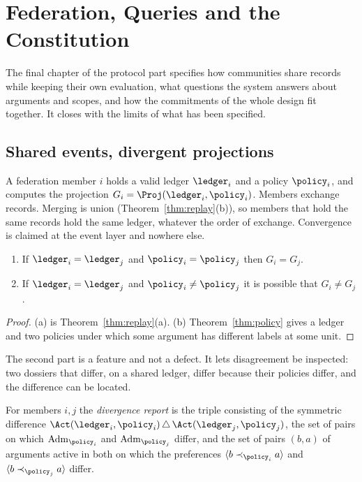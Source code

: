 \chapter{Federation, Queries and the Constitution}\label{ch:federation}

The final chapter of the protocol part specifies how communities share records while keeping their own evaluation, what questions the system answers about arguments and scopes, and how the commitments of the whole design fit together. It closes with the limits of what has been specified.

\section{Shared events, divergent projections}\label{sec:federation}

A federation member $i$ holds a valid ledger $\ledger_i$ and a policy $\policy_i$, and computes the projection $G_i=\Proj(\ledger_i,\policy_i)$. Members exchange records. Merging is union (Theorem~\ref{thm:replay}(b)), so members that hold the same records hold the same ledger, whatever the order of exchange. Convergence is claimed at the event layer and nowhere else.

\begin{proposition}\label{prop:eventlayer}
\begin{enumerate}[label=(\alph*)]
\item If $\ledger_i=\ledger_j$ and $\policy_i=\policy_j$ then $G_i=G_j$.
\item If $\ledger_i=\ledger_j$ and $\policy_i\ne\policy_j$ it is possible that $G_i\ne G_j$.
\end{enumerate}
\end{proposition}

\begin{proof}
(a) is Theorem~\ref{thm:replay}(a). (b) Theorem~\ref{thm:policy} gives a ledger and two policies under which some argument has different labels at some unit.
\end{proof}

The second part is a feature and not a defect. It lets disagreement be inspected: two dossiers that differ, on a shared ledger, differ because their policies differ, and the difference can be located.

\begin{definition}\label{def:divreport}
For members $i,j$ the \emph{divergence report} is the triple consisting of the symmetric difference $\Act(\ledger_i,\policy_i)\,\triangle\,\Act(\ledger_j,\policy_j)$, the set of pairs on which $\mathrm{Adm}_{\policy_i}$ and $\mathrm{Adm}_{\policy_j}$ differ, and the set of pairs $(b,a)$ of arguments active in both on which the preferences $\langle b\prec_{\policy_i}a\rangle$ and $\langle b\prec_{\policy_j}a\rangle$ differ.
\end{definition}

